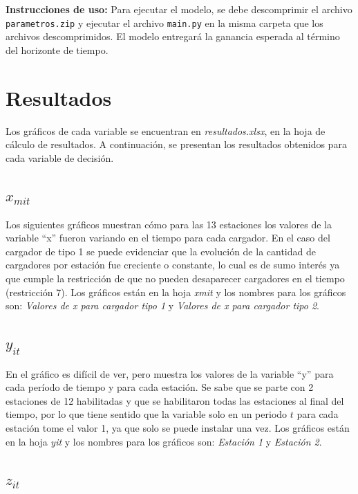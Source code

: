 \documentclass[letterpaper]{article}
\begin{document}
\begin{flushleft}
	\textbf{Instrucciones de uso:} Para ejecutar el modelo, se debe descomprimir el archivo \texttt{parametros.zip} y ejecutar el archivo \texttt{main.py} en la misma carpeta que los archivos descomprimidos. El modelo entregará la ganancia esperada al término del horizonte de tiempo.

	\section{Resultados}

	Los gráficos de cada variable se encuentran en \textit{resultados.xlsx}, en la hoja de cálculo de resultados. A continuación, se presentan los resultados obtenidos para cada variable de decisión.

	\subsection{\texorpdfstring{$x_{mit}$}{xmit}}

	Los siguientes gráficos muestran cómo para las 13 estaciones los valores de la variable “x” fueron variando en el tiempo para cada cargador. En el caso del cargador de tipo 1 se puede evidenciar que la evolución de la cantidad de cargadores por estación fue creciente o constante, lo cual es de sumo interés ya que cumple la restricción de que no pueden desaparecer cargadores en el tiempo (restricción 7). Los gráficos están en la hoja \textit{xmit} y los nombres para los gráficos son: \textit{Valores de x para cargador tipo 1} y \textit{Valores de x para cargador tipo 2}.

	\subsection{\texorpdfstring{$y_{it}$}{yit}}

	En el gráfico es difícil de ver, pero muestra los valores de la variable “y” para cada período de tiempo y para cada estación. Se sabe que se parte con 2 estaciones de 12 habilitadas y que se habilitaron todas las estaciones al final del tiempo, por lo que tiene sentido que la variable solo en un periodo $t$ para cada estación tome el valor 1, ya que solo se puede instalar una vez. Los gráficos están en la hoja \textit{yit} y los nombres para los gráficos son: \textit{Estación 1} y \textit{Estación 2}.

	\subsection{\texorpdfstring{$z_{it}$}{zit}}


\end{flushleft}
\end{document}
